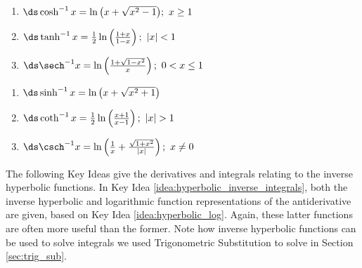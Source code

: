 \setboxwidth{120pt}
\noindent\hskip-120pt
\begin{minipage}{\specialboxlength}
{\noindent%
\begin{minipage}[t]{.5\specialboxlength}
\begin{enumerate}
\item $\ds\cosh^{-1}x=\ln\big(x+\sqrt{x^2-1}\big);\ x\geq1$\rule[-10pt]{0pt}{20pt}
\item $\ds\tanh^{-1}x = \frac12\ln\left(\frac{1+x}{1-x}\right);\ |x|<1$\rule[-10pt]{0pt}{20pt}
\item $\ds \sech^{-1}x = \ln\left(\frac{1+\sqrt{1-x^2}}x\right);\ 0<x\leq1$\rule[-10pt]{0pt}{20pt}
\end{enumerate}
\end{minipage}
\begin{minipage}[t]{.5\specialboxlength}
\begin{enumerate}\addtocounter{enumi}{3}
\item $\ds\sinh^{-1}x = \ln\big(x+\sqrt{x^2+1}\big)$\rule[-10pt]{0pt}{20pt}
\item	 $\ds\coth^{-1}x = \frac12\ln\left(\frac{x+1}{x-1}\right);\ |x|>1$\rule[-10pt]{0pt}{20pt}
\item $\ds\csch^{-1}x = \ln\left(\frac1x+\frac{\sqrt{1+x^2}}{|x|}\right);\ x\neq0$\rule[-10pt]{0pt}{20pt}
\end{enumerate}
\end{minipage}
}
\end{minipage}
\restoreboxwidth

The following Key Ideas give the derivatives and integrals relating to the inverse hyperbolic functions. In Key Idea \ref{idea:hyperbolic_inverse_integrals}, both the inverse hyperbolic and logarithmic function representations of the antiderivative are given, based on Key Idea \ref{idea:hyperbolic_log}. Again, these latter functions are often more useful than the former. Note how inverse hyperbolic functions can be used to solve integrals we used Trigonometric Substitution to solve in Section \ref{sec:trig_sub}.





